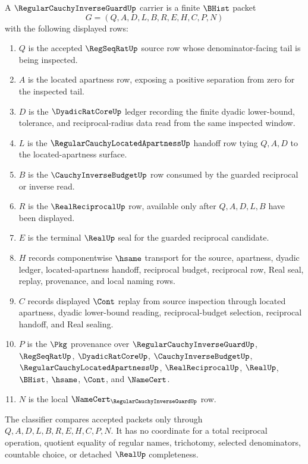 \begin{definition}
\label{def:regular-cauchy-inverse-guard-carrier}
A $\RegularCauchyInverseGuardUp$ carrier is a finite $\BHist$ packet
$$
G=(Q,A,D,L,B,R,E,H,C,P,N)
$$
with the following displayed rows:
\begin{enumerate}
\item $Q$ is the accepted $\RegSeqRatUp$ source row whose denominator-facing tail is being inspected.
\item $A$ is the located apartness row, exposing a positive separation from zero for the inspected tail.
\item $D$ is the $\DyadicRatCoreUp$ ledger recording the finite dyadic lower-bound, tolerance, and reciprocal-radius data read from the same inspected window.
\item $L$ is the $\RegularCauchyLocatedApartnessUp$ handoff row tying $Q,A,D$ to the located-apartness surface.
\item $B$ is the $\CauchyInverseBudgetUp$ row consumed by the guarded reciprocal or inverse read.
\item $R$ is the $\RealReciprocalUp$ row, available only after $Q,A,D,L,B$ have been displayed.
\item $E$ is the terminal $\RealUp$ seal for the guarded reciprocal candidate.
\item $H$ records componentwise $\hsame$ transport for the source, apartness, dyadic ledger, located-apartness handoff, reciprocal budget, reciprocal row, Real seal, replay, provenance, and local naming rows.
\item $C$ records displayed $\Cont$ replay from source inspection through located apartness, dyadic lower-bound reading, reciprocal-budget selection, reciprocal handoff, and Real sealing.
\item $P$ is the $\Pkg$ provenance over $\RegularCauchyInverseGuardUp$, $\RegSeqRatUp$, $\DyadicRatCoreUp$, $\CauchyInverseBudgetUp$, $\RegularCauchyLocatedApartnessUp$, $\RealReciprocalUp$, $\RealUp$, $\BHist$, $\hsame$, $\Cont$, and $\NameCert$.
\item $N$ is the local $\NameCert_{\RegularCauchyInverseGuardUp}$ row.
\end{enumerate}
The classifier compares accepted packets only through $Q,A,D,L,B,R,E,H,C,P,N$. It has no coordinate for a total reciprocal operation, quotient equality of regular names, trichotomy, selected denominators, countable choice, or detached $\RealUp$ completeness.
\end{definition}

